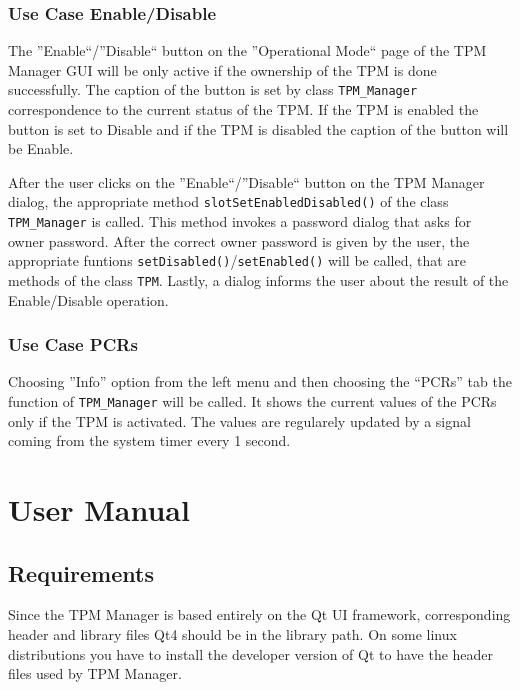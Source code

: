 \documentclass[
  american        %
]{sirrixreport}
\begin{document}
\subsection{Use Case Enable/Disable}
The ''Enable``/''Disable`` button on the ''Operational Mode`` page of the TPM Manager GUI will be only active if the ownership of the TPM is done successfully. The caption of the button is set by class \lstinline'TPM_Manager' correspondence to the current status of the TPM. If the TPM is enabled the button is set to Disable and if the TPM is disabled the caption of the button will be Enable.

After the user clicks on the ''Enable``/''Disable`` button on the TPM Manager dialog, the appropriate method \lstinline'slotSetEnabledDisabled()' of the class \lstinline'TPM_Manager' is called. This method invokes a password dialog that asks for owner password. After the correct owner password is given by the user, the appropriate funtions \lstinline'setDisabled()'/\lstinline'setEnabled()' will be called, that are methods of the class \lstinline'TPM'. Lastly, a dialog informs the user about the result of the Enable/Disable operation.

\subsection{Use Case PCRs}
Choosing ''Info'' option from the left menu and then choosing the ``PCRs'' tab the function of \lstinline'TPM_Manager' will be called. It shows the current values of the PCRs only if the TPM is activated. The values are regularely updated by a signal coming from the system timer every 1 second. 

\chapter{User Manual}

\section{Requirements}
Since the TPM Manager is based entirely on the Qt UI framework, corresponding header and library files Qt4 should be in the library path. On some linux distributions you have to install the developer version of Qt to have the header files used by TPM Manager.
\end{document}
